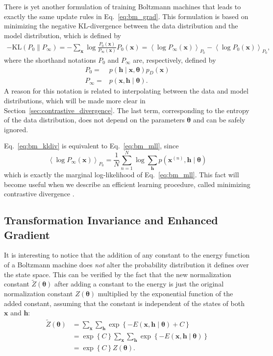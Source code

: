 \documentclass{now}
\newcommand{\vect}[1]{\mathbf{#1}}
\newcommand{\vects}[1]{\boldsymbol{#1}}
\newcommand{\vh}[0]{\vect{h}}
\newcommand{\vx}[0]{\vect{x}}
\newcommand{\TT}[0]{{\vects{\theta}}}
\newcommand{\KL}[0]{\text{KL}}
\begin{document}
There is yet another formulation of training Boltzmann
machines that leads to exactly the same update rules in
Eq.~\eqref{eq:bm_grad}. This formulation is based on
minimizing the negative KL-divergence between the
data distribution and the model distribution, which is
defined by
\begin{align}
    \label{eq:bm_kldiv}
    -\KL(P_0 \| P_\infty) = -\sum_{\vx} \log
    \frac{P_0(\vx)}{P_\infty(\vx)} P_0(\vx) =
    \left<\log P_\infty(\vx) \right>_{P_0} - \left< \log P_0
    (\vx) \right>_{P_0},
\end{align}
where the shorthand notations $P_0$ and $P_\infty$ are,
respectively, 
defined by
\begin{align*}
    P_0 =& p\left(\vh \mid \vx, \TT\right)p_D\left(\vx\right)
    \\
    P_\infty =& p\left(\vx, \vh \mid \TT\right).
\end{align*}
A reason for this notation is related to interpolating
between the data and model distributions, which will be made
more clear in Section~\ref{sec:contrastive_divergence}. The
last term, corresponding to the entropy of the data
distribution, does not depend on the parameters $\TT$ and
can be safely ignored.

Eq.~\eqref{eq:bm_kldiv} is equivalent
to Eq.~\eqref{eq:bm_mll}, since
\[
\left< \log P_\infty(\vx) \right>_{P_0} = \frac{1}{N}
\sum_{n=1}^N \log \sum_{\vh} p(\vx^{(n)}, \vh \mid \TT)
\]
which is exactly the marginal log-likelihood of
Eq.~\eqref{eq:bm_mll}. This fact will become useful when we
describe an efficient learning procedure, called minimizing
contrastive divergence \citep{Hinton2002}.

\subsection{Transformation Invariance and Enhanced Gradient}
\label{sec:enhanced_grad}

It is interesting to notice that the addition of any constant
to the energy function of a Boltzmann machine does
\textit{not} alter the probability distribution it defines
over the state space. This can be 
verified by the
fact that the new normalization constant $\tilde{Z}(\TT)$
after adding a constant to the energy is just the original
normalization constant $Z(\TT)$ multiplied by the exponential
function of the added constant, assuming that the constant
is independent of the states of both $\vx$ and $\vh$:
\begin{align*}
    \tilde{Z}(\TT) &= \sum_\vx \sum_\vh \exp\left\{
    -E(\vx, \vh \mid \TT) + C \right\} \\
    &= \exp\left\{ C \right\} \sum_\vx \sum_\vh \exp\left\{
    -E(\vx, \vh \mid \TT) \right\} \\
    &= \exp\left\{ C \right\} Z(\TT).
\end{align*}
\end{document}
